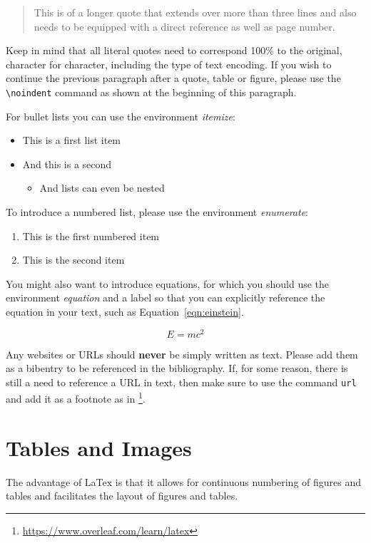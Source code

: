 \documentclass[a4paper,fontsize=12pt,listof=totoc,bibliography=totoc]{scrbook}
\begin{document}
\begin{quote}
This is of a longer quote that extends over more than three lines and also needs to be equipped with a direct reference as well as page number. \citep[][8]{Goodfellow-et-al-2016}
\end{quote} 

\noindent Keep in mind that all literal quotes need to correspond 100\% to the original, character for character, including the type of text encoding. If you wish to continue the previous paragraph after a quote, table or figure, please use the \verb|\noindent| command as shown at the beginning of this paragraph.

For bullet lists you can use the environment \textit{itemize}: 
\begin{itemize}
    \item This is a first list item 
    \item And this is a second 
    \begin{itemize}
        \item And lists can even be nested
    \end{itemize}
\end{itemize}

To introduce a numbered list, please use the environment \textit{enumerate}:
\begin{enumerate}
    \item This is the first numbered item 
    \item This is the second item
\end{enumerate}

You might also want to introduce equations, for which you should use the environment \textit{equation} and a label so that you can explicitly reference the equation in your text, such as Equation~\ref{eqn:einstein}.

\begin{equation}
    \label{eqn:einstein}
     E=mc^2
\end{equation}

Any websites or URLs should \textbf{never} be simply written as text. Please add them as a bibentry to be referenced in the bibliography. If, for some reason, there is still a need to reference a URL in text, then make sure to use the command \texttt{url} and add it as a footnote as in \footnote{\url{https://www.overleaf.com/learn/latex}}.

\section{Tables and Images}
The advantage of LaTex is that it allows for continuous numbering of figures and tables and facilitates the layout of figures and tables. 
\end{document}
